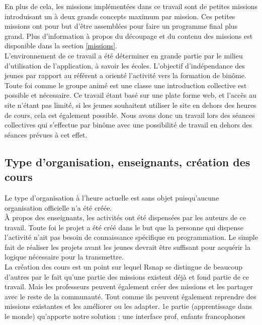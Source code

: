 En plus de cela, les missions implémentées dans ce travail sont de petites missions introduisant un à deux grands concepts maximum par mission. Ces petites missions ont pour but d'être assemblées pour faire un programme final plus grand. Plus d'information à propos du découpage et du contenu des missions est disponible dans la section \ref{missions}.\\

L'environnement de ce travail a été déterminer en grande partie par le milieu d'utilisation de l'application, à savoir les écoles. L'objectif d'indépendance des jeunes par rapport au référent a orienté l'activité vers la formation de binôme. Toute foi comme le groupe animé est une classe une introduction collective est possible et nécessaire. Ce travail étant basé sur une plate forme web, et l'accès au site n'étant pas limité, si les jeunes souhaitent utiliser le site en dehors des heures de cours, cela est également possible.
Nous avons donc un travail lors des séances collectives qui s'effectue par binôme avec une possibilité de travail en dehors des séances prévues à cet effet.

\subsection{Type d'organisation, enseignants, création des cours}
Le type d'organisation à l'heure actuelle est sans objet puisqu'aucune organisation officielle n'a été créée.\\

À propos des enseignants, les activités ont été dispensées par les auteurs de ce travail. Toute foi le projet a été créé dans le but que la personne qui dispense l'activité n'ait pas besoin de connaissance spécifique en programmation. Le simple fait de réaliser les projets avant les jeunes devrait être suffisant pour acquérir la logique nécessaire pour la transmettre.\\

La création des cours est un point sur lequel Rsnap se distingue de beaucoup d'autres par le fait qu'une partie des missions existent déjà et fond partie de ce travail. Mais les professeurs peuvent également créer des missions et les partager avec le reste de la communauté. Tout comme ils peuvent également reprendre des missions existantes et les améliorer ou les adapter. %
1e partie (apprentissage dans le monde) qu'apporte notre solution : une interface prof, enfants francophones

